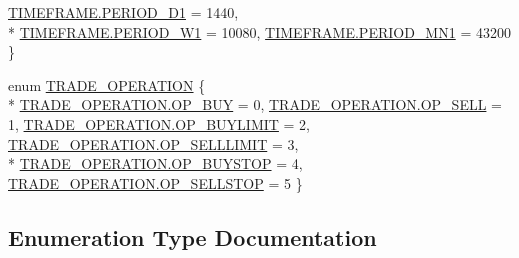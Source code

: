 \begin{DoxyCompactItemize}
\hyperlink{namespace_m_q_l4_c_sharp_1_1_base_1_1_enums_a838810aaa87c63c12737408dba8c0b35a06256b46f71703fbe22f61e0997f4c66}{T\+I\+M\+E\+F\+R\+A\+M\+E.\+P\+E\+R\+I\+O\+D\+\_\+\+D1} = 1440, 
\\*
\hyperlink{namespace_m_q_l4_c_sharp_1_1_base_1_1_enums_a838810aaa87c63c12737408dba8c0b35ad39bd1166fc469d970a6c48d09af9e83}{T\+I\+M\+E\+F\+R\+A\+M\+E.\+P\+E\+R\+I\+O\+D\+\_\+\+W1} = 10080, 
\hyperlink{namespace_m_q_l4_c_sharp_1_1_base_1_1_enums_a838810aaa87c63c12737408dba8c0b35a55cdc2f95cea96d8c9dfca95d92f2e2f}{T\+I\+M\+E\+F\+R\+A\+M\+E.\+P\+E\+R\+I\+O\+D\+\_\+\+M\+N1} = 43200
 \}
\item 
enum \hyperlink{namespace_m_q_l4_c_sharp_1_1_base_1_1_enums_aa66cfebab64daf6099edf09607bbb1d9}{T\+R\+A\+D\+E\+\_\+\+O\+P\+E\+R\+A\+T\+I\+ON} \{ \\*
\hyperlink{namespace_m_q_l4_c_sharp_1_1_base_1_1_enums_aa66cfebab64daf6099edf09607bbb1d9a542869a21e9ac9b469f7cbedba9980f1}{T\+R\+A\+D\+E\+\_\+\+O\+P\+E\+R\+A\+T\+I\+O\+N.\+O\+P\+\_\+\+B\+UY} = 0, 
\hyperlink{namespace_m_q_l4_c_sharp_1_1_base_1_1_enums_aa66cfebab64daf6099edf09607bbb1d9a50a3e8c9ee54ce38090be5257d9965ea}{T\+R\+A\+D\+E\+\_\+\+O\+P\+E\+R\+A\+T\+I\+O\+N.\+O\+P\+\_\+\+S\+E\+LL} = 1, 
\hyperlink{namespace_m_q_l4_c_sharp_1_1_base_1_1_enums_aa66cfebab64daf6099edf09607bbb1d9ac9bc67fefcbe1d8e62e42dc5fa0085e9}{T\+R\+A\+D\+E\+\_\+\+O\+P\+E\+R\+A\+T\+I\+O\+N.\+O\+P\+\_\+\+B\+U\+Y\+L\+I\+M\+IT} = 2, 
\hyperlink{namespace_m_q_l4_c_sharp_1_1_base_1_1_enums_aa66cfebab64daf6099edf09607bbb1d9aa9b6c7a28e3b826e0a847614b7b1cdb0}{T\+R\+A\+D\+E\+\_\+\+O\+P\+E\+R\+A\+T\+I\+O\+N.\+O\+P\+\_\+\+S\+E\+L\+L\+L\+I\+M\+IT} = 3, 
\\*
\hyperlink{namespace_m_q_l4_c_sharp_1_1_base_1_1_enums_aa66cfebab64daf6099edf09607bbb1d9af7794f011c53d81ff0e2d58df050136e}{T\+R\+A\+D\+E\+\_\+\+O\+P\+E\+R\+A\+T\+I\+O\+N.\+O\+P\+\_\+\+B\+U\+Y\+S\+T\+OP} = 4, 
\hyperlink{namespace_m_q_l4_c_sharp_1_1_base_1_1_enums_aa66cfebab64daf6099edf09607bbb1d9adeb1649e45f2d9ce0a768f5dd699afe8}{T\+R\+A\+D\+E\+\_\+\+O\+P\+E\+R\+A\+T\+I\+O\+N.\+O\+P\+\_\+\+S\+E\+L\+L\+S\+T\+OP} = 5
 \}
\end{DoxyCompactItemize}


\subsection{Enumeration Type Documentation}
